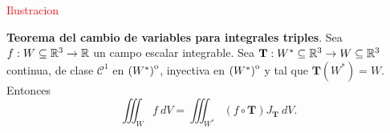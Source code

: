  \textcolor{red}{Ilustracion}


\begin{theorem}
    \textbf{Teorema del cambio de variables para integrales triples}. Sea $f:W\subseteq\mathbb{R}^3\to\mathbb{R}$  un campo escalar integrable. Sea $\mathbf{T}:W^*\subseteq\mathbb{R}^3\to W\subseteq\mathbb{R}^3$ continua, de clase $\mathcal{C}^1$ en ${\kern0pt(W^*)}^{\mathrm{o}}$,  inyectiva en ${\kern0pt(W^*)}^{\mathrm{o}}$ y tal que $\mathbf{T}(W^*)=W$. Entonces
    \[
        \iiint_W f\:dV=\iiint_{W^*}(f\circ\mathbf{T})J_\mathbf{T}\:dV.
    \]
\end{theorem}
